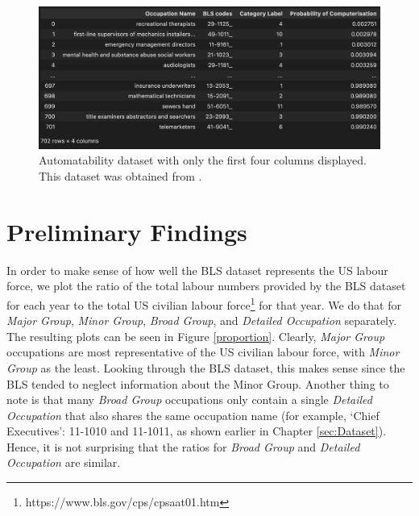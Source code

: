 \documentclass[11pt]{article}
\begin{document}
\begin{figure}[!htb]
	\centering
	\includegraphics[width=15cm]{Figures/Automatability dataset.png}
	\caption{Automatability dataset with only the first four columns displayed. This dataset was obtained from \cite{osborne2017future}.}
	\label{fig:autodata}
\end{figure}


\newpage

\section{Preliminary Findings}
\label{sec:prelim findings}

In order to make sense of how well the BLS dataset represents the US labour force, we plot the ratio of the total labour numbers provided by the BLS dataset for each year to the total US civilian labour force\footnote{https://www.bls.gov/cps/cpsaat01.htm} for that year. We do that for \emph{Major Group}, \emph{Minor Group}, \emph{Broad Group}, and \emph{Detailed Occupation} separately. The resulting plots can be seen in Figure \ref{proportion}. Clearly, \emph{Major Group} occupations are most representative of the US civilian labour force, with \emph{Minor Group} as the least. Looking through the BLS dataset, this makes sense since the BLS tended to neglect information about the Minor Group. Another thing to note is that many \emph{Broad Group} occupations only contain a single \emph{Detailed Occupation} that also shares the same occupation name (for example, `Chief Executives': 11-1010 and 11-1011, as shown earlier in Chapter \ref{sec:Dataset}). Hence, it is not surprising that the ratios for \emph{Broad Group} and \emph{Detailed Occupation} are similar.
\end{document}
